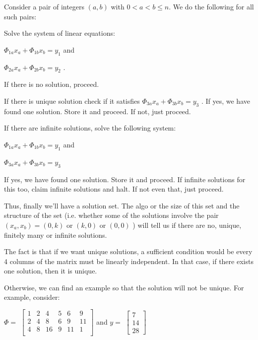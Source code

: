 \documentclass[fleqn, 11pt]{article}
\begin{document}
 
 Consider a pair of integers $(a,b)$ with $0<a<b \leq n$. 
 We do the following for all such pairs: 
 
 Solve the system of linear equations: 
 
 $\Phi_{1a} x_a +\Phi_{1b} x_b = y_1 $   and 
 
 $\Phi_{2a} x_a +\Phi_{2b} x_b = y_2 $ . 
 
 If there is no solution, proceed. 
 
 If there is unique solution check if it satisfies $\Phi_{3a} x_a +\Phi_{3b} x_b = y_3 $ . If yes, we have found one solution. Store it and proceed. If not, just proceed. 
 
 If there are infinite solutions, solve the following system: 
 
 
 $\Phi_{1a} x_a +\Phi_{1b} x_b = y_1 $   and 
 
 $\Phi_{3a} x_a +\Phi_{3b} x_b = y_3 $ 
 
 If yes, we have found one solution. Store it and proceed. 
 If infinite solutions for this too, claim infinite solutions and halt.
 If not even that, just proceed. 
 
 \medskip
 
 Thus, finally we'll have a solution set. The algo or 
 the size of this set 
 and the structure of the set (i.e. whether some of the solutions
 involve the pair $(x_a, x_b)=(0,k)$ or $(k,0)$ or $(0,0)$ )
 will tell us
 if there are no, unique, finitely many or infinite solutions. 
 
\bigskip

The fact is that if we want unique solutions, a sufficient condition would be 
every 4 columns of the matrix must be linearly independent. In that case, 
if there exists one solution, then it is unique. 

Otherwise, we can find an example so that the solution will not be unique.
For example, consider: 

$ \Phi = $  $\begin{bmatrix}
    1 & 2 & 4 & 5 & 6 & 9\\
    2 & 4 & 8 & 6 & 9 & 11\\
    4 & 8 & 16 & 9 & 11 & 1\\
    \end{bmatrix} $
  and  
$    y= $  $\begin{bmatrix}
    7 \\
    14 \\
    28
    \end{bmatrix}$
    
\end{document}
